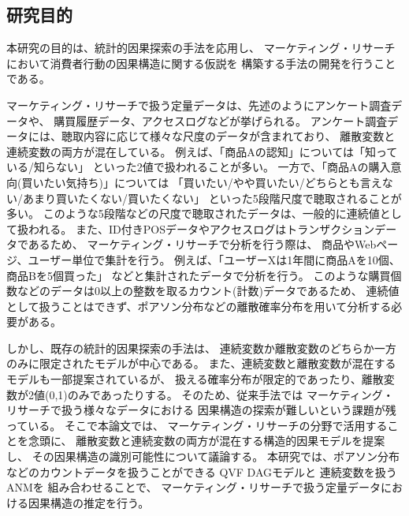 
\subsection{研究目的}

本研究の目的は、統計的因果探索の手法を応用し、
マーケティング・リサーチにおいて消費者行動の因果構造に関する仮説を
構築する手法の開発を行うことである。

マーケティング・リサーチで扱う定量データは、先述のようにアンケート調査データや、
購買履歴データ、アクセスログなどが挙げられる。
アンケート調査データには、聴取内容に応じて様々な尺度のデータが含まれており、
離散変数と連続変数の両方が混在している。
例えば、「商品Aの認知」については「知っている/知らない」
といった2値で扱われることが多い。
一方で、「商品Aの購入意向(買いたい気持ち)」については
「買いたい/やや買いたい/どちらとも言えない/あまり買いたくない/買いたくない」
といった5段階尺度で聴取されることが多い。
このような5段階などの尺度で聴取されたデータは、一般的に連続値として扱われる。
また、ID付きPOSデータやアクセスログはトランザクションデータであるため、
マーケティング・リサーチで分析を行う際は、
商品やWebページ、ユーザー単位で集計を行う。
例えば、「ユーザーXは1年間に商品Aを10個、商品Bを5個買った」
などと集計されたデータで分析を行う。
このような購買個数などのデータは0以上の整数を取るカウント(計数)データであるため、
連続値として扱うことはできず、ポアソン分布などの離散確率分布を用いて分析する必要がある。

しかし、既存の統計的因果探索の手法は、
連続変数か離散変数のどちらか一方のみに限定されたモデルが中心である。
また、連続変数と離散変数が混在するモデルも一部提案されているが、
扱える確率分布が限定的であったり、離散変数が2値(0,1)のみであったりする。
そのため、従来手法では
マーケティング・リサーチで扱う様々なデータにおける
因果構造の探索が難しいという課題が残っている。
そこで本論文では、
マーケティング・リサーチの分野で活用することを念頭に、
離散変数と連続変数の両方が混在する構造的因果モデルを提案し、
その因果構造の識別可能性について議論する。
本研究では、ポアソン分布などのカウントデータを扱うことができる
QVF DAGモデル\cite{Park2017-hw}と
連続変数を扱うANM\cite{Park2020-ey}を
組み合わせることで、
マーケティング・リサーチで扱う定量データにおける因果構造の推定を行う。


